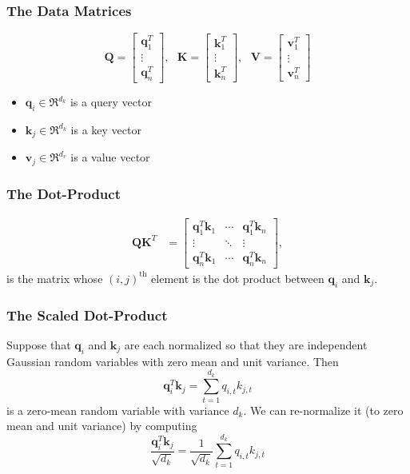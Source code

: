 \documentclass{beamer}
\begin{document}
\begin{frame}
  \frametitle{The Data Matrices}

  \begin{displaymath}
    \bm{Q} = \left[\begin{array}{c}\bm{q}_1^T\\\vdots\\\bm{q}_n^T\end{array}\right],~~~
    \bm{K} = \left[\begin{array}{c}\bm{k}_1^T\\\vdots\\\bm{k}_n^T\end{array}\right],~~~
    \bm{V} = \left[\begin{array}{c}\bm{v}_1^T\\\vdots\\\bm{v}_n^T\end{array}\right]
  \end{displaymath}
  \begin{itemize}
  \item $\bm{q}_i\in\Re^{d_k}$ is a query vector
  \item $\bm{k}_j\in\Re^{d_k}$ is a key vector
  \item $\bm{v}_j\in\Re^{d_v}$ is a value vector
  \end{itemize}
\end{frame}

\begin{frame}
  \frametitle{The Dot-Product}

  \begin{align*}
    \bm{Q}\bm{K}^T &=
    \left[\begin{array}{ccc}
        \bm{q}_1^T\bm{k}_1 & \cdots & \bm{q}_1^T\bm{k}_n\\
        \vdots & \ddots & \vdots \\
        \bm{q}_n^T\bm{k}_1 & \cdots & \bm{q}_n^T\bm{k}_n
      \end{array}\right],
  \end{align*}
  is the matrix whose $(i,j)^{\textrm{th}}$ element is the dot product between $\bm{q}_i$ and $\bm{k}_j$.
\end{frame}

\begin{frame}
  \frametitle{The Scaled Dot-Product}
  
  Suppose that $\bm{q}_i$ and $\bm{k}_j$ are each normalized so that they are
  independent Gaussian random variables with zero mean and unit variance.  Then
  \begin{displaymath}
    \bm{q}_i^T\bm{k}_j = \sum_{t=1}^{d_k} q_{i,t}k_{j,t}
  \end{displaymath}
  is a zero-mean random variable with variance $d_k$.  We can
  re-normalize it (to zero mean and unit variance) by computing
  \begin{displaymath}
    \frac{\bm{q}_i^T\bm{k}_j}{\sqrt{d_k}} = \frac{1}{\sqrt{d_k}}\sum_{t=1}^{d_k} q_{i,t}k_{j,t}
  \end{displaymath}
\end{frame}
\end{document}
